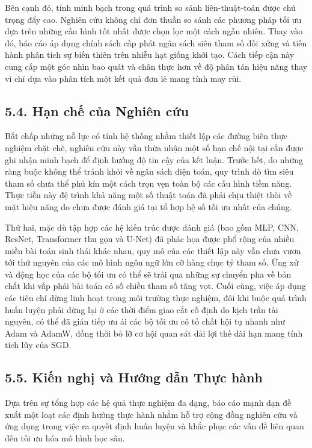 \documentclass[a4paper,12pt]{article}
\begin{document}
Bên cạnh đó, tính minh bạch trong quá trình so sánh liên-thuật-toán được chú trọng đẩy cao. Nghiên cứu không chỉ đơn thuần so sánh các phương pháp tối ưu dựa trên những cấu hình tốt nhất được chọn lọc một cách ngẫu nhiên. Thay vào đó, báo cáo áp dụng chính sách cấp phát ngân sách siêu tham số đối xứng và tiến hành phân tích sự biến thiên trên nhiễu hạt giống khởi tạo. Cách tiếp cận này cung cấp một góc nhìn bao quát và chân thực hơn về độ phân tán hiệu năng thay vì chỉ dựa vào phân tích một kết quả đơn lẻ mang tính may rủi.

\subsection{5.4. Hạn chế của Nghiên cứu}

Bất chấp những nỗ lực có tính hệ thống nhằm thiết lập các đường biên thực nghiệm chặt chẽ, nghiên cứu này vẫn thừa nhận một số hạn chế nội tại cần được ghi nhận minh bạch để định hướng độ tin cậy của kết luận. Trước hết, do những ràng buộc không thể tránh khỏi về ngân sách điện toán, quy trình dò tìm siêu tham số chưa thể phủ kín một cách trọn vẹn toàn bộ các cấu hình tiềm năng. Thực tiễn này đệ trình khả năng một số thuật toán đã phải chịu thiệt thòi về mặt hiệu năng do chưa được đánh giá tại tổ hợp hệ số tối ưu nhất của chúng.

Thứ hai, mặc dù tập hợp các hệ kiến trúc được đánh giá (bao gồm MLP, CNN, ResNet, Transformer thu gọn và U-Net) đã phác họa được phổ rộng của nhiều miền bài toán sinh thái khác nhau, quy mô của các thiết lập này vẫn chưa vươn tới thứ nguyên của các mô hình ngôn ngữ lớn cỡ hàng chục tỷ tham số. Ứng xử và động học của các bộ tối ưu có thể sẽ trải qua những sự chuyển pha về bản chất khi vấp phải bài toán có số chiều tham số tăng vọt. Cuối cùng, việc áp dụng các tiêu chí dừng linh hoạt trong môi trường thực nghiệm, đôi khi buộc quá trình huấn luyện phải dừng lại ở các thời điểm giao cắt cố định do kịch trần tài nguyên, có thể đã gián tiếp ưu ái các bộ tối ưu có tố chất hội tụ nhanh như Adam và AdamW, đồng thời bỏ lỡ cơ hội quan sát dải lợi thế dài hạn mang tính tích lũy của SGD.

\subsection{5.5. Kiến nghị và Hướng dẫn Thực hành}

Dựa trên sự tổng hợp các hệ quả thực nghiệm đa dạng, báo cáo mạnh dạn đề xuất một loạt các định hướng thực hành nhằm hỗ trợ cộng đồng nghiên cứu và ứng dụng trong việc ra quyết định huấn luyện và khắc phục các vấn đề liên quan đến tối ưu hóa mô hình học sâu.
\end{document}
